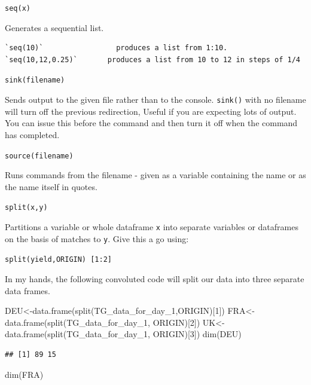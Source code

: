 \documentclass[
]{book}
\newenvironment{Shaded}{\begin{snugshade}}{\end{snugshade}}
\newcommand{\DecValTok}[1]{\textcolor[rgb]{0.00,0.00,0.81}{#1}}
\newcommand{\FunctionTok}[1]{\textcolor[rgb]{0.00,0.00,0.00}{#1}}
\newcommand{\NormalTok}[1]{#1}
\newcommand{\OtherTok}[1]{\textcolor[rgb]{0.56,0.35,0.01}{#1}}
\begin{document}
\texttt{seq(x)}

Generates a sequential list.

\begin{verbatim}
`seq(10)`                 produces a list from 1:10. 
`seq(10,12,0.25)`       produces a list from 10 to 12 in steps of 1/4
\end{verbatim}

\texttt{sink(filename)}

Sends output to the given file rather than to the console. \texttt{sink()} with no filename will turn off the previous redirection, Useful if you are expecting lots of output. You can issue this before the command and then turn it off when the command has completed.

\texttt{source(filename)}

Runs commands from the filename - given as a variable containing the name or as the name itself in quotes.

\texttt{split(x,y)}

Partitions a variable or whole dataframe \texttt{x} into separate variables or dataframes on the basis of matches to \texttt{y}. Give this a go using:

\texttt{split(yield,ORIGIN)\ {[}1:2{]}}

In my hands, the following convoluted code will split our data into three separate data frames.

\begin{Shaded}
\begin{Highlighting}[]
\NormalTok{DEU}\OtherTok{\textless{}{-}}\FunctionTok{data.frame}\NormalTok{(}\FunctionTok{split}\NormalTok{(TG\_data\_for\_day\_1,ORIGIN)[}\DecValTok{1}\NormalTok{])}
\NormalTok{FRA}\OtherTok{\textless{}{-}}\FunctionTok{data.frame}\NormalTok{(}\FunctionTok{split}\NormalTok{(TG\_data\_for\_day\_1, ORIGIN)[}\DecValTok{2}\NormalTok{])}
\NormalTok{UK}\OtherTok{\textless{}{-}}\FunctionTok{data.frame}\NormalTok{(}\FunctionTok{split}\NormalTok{(TG\_data\_for\_day\_1, ORIGIN)[}\DecValTok{3}\NormalTok{])}
\FunctionTok{dim}\NormalTok{(DEU)}
\end{Highlighting}
\end{Shaded}

\begin{verbatim}
## [1] 89 15
\end{verbatim}

\begin{Shaded}
\begin{Highlighting}[]
\FunctionTok{dim}\NormalTok{(FRA)}
\end{Highlighting}
\end{Shaded}
\end{document}
